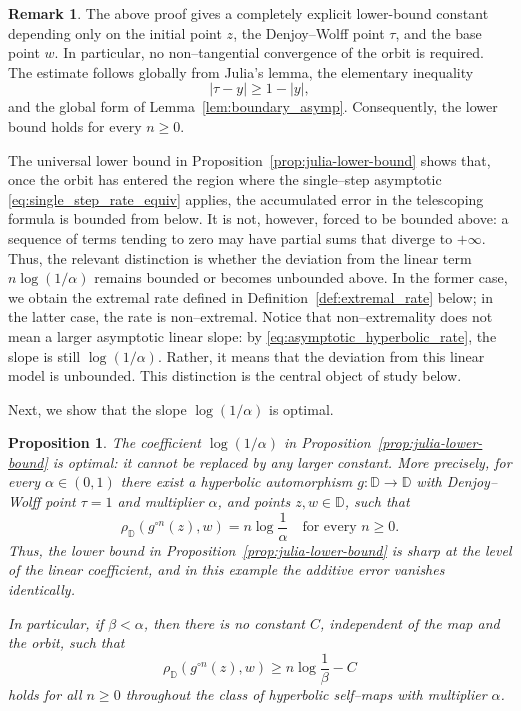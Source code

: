 \documentclass[12pt]{amsart}
\numberwithin{equation}{section}
\theoremstyle{plain}
\newtheorem{proposition}[equation]{Proposition}
\theoremstyle{definition}
\newtheorem{remark}[equation]{Remark}
\begin{document}
\begin{remark}
The above proof gives a completely explicit lower-bound constant depending
only on the initial point $z$, the Denjoy--Wolff point $\tau$, and the
base point $w$. In particular, no non--tangential convergence of the
orbit is required. The estimate follows globally from Julia's lemma,
the elementary inequality
\begin{equation*}
|\tau-y|\geq1-|y|,
\end{equation*}
and the global form of Lemma~\ref{lem:boundary_asymp}.
Consequently, the lower bound holds for every $n\geq0$.
\end{remark}



The universal lower bound in Proposition~\ref{prop:julia-lower-bound}
shows that, once the orbit has entered the region where the
single--step asymptotic \eqref{eq:single_step_rate_equiv} applies, the
accumulated error in the telescoping formula is bounded from below.
It is not, however, forced to be bounded above: a sequence of terms
tending to zero may have partial sums that diverge to $+\infty$.
Thus, the relevant distinction is whether the deviation from the
linear term $n\log(1/\alpha)$ remains bounded or becomes unbounded
above. In the former case, we obtain the extremal rate defined in
Definition~\ref{def:extremal_rate} below; in the latter case, the rate is
non--extremal. Notice that non--extremality does not mean a larger
asymptotic linear slope: by \eqref{eq:asymptotic_hyperbolic_rate}, the
slope is still $\log(1/\alpha)$. Rather, it means that the deviation
from this linear model is unbounded. This distinction is the central object of study below.

Next, we show that the slope $\log(1/\alpha)$ is optimal.
\begin{proposition}
\label{prop:sharpness}
The coefficient $\log(1/\alpha)$ in
Proposition~\ref{prop:julia-lower-bound} is optimal: it cannot be
replaced by any larger constant. More precisely, for every
$\alpha\in(0,1)$ there exist a hyperbolic automorphism
$g:\mathbb{D}\to\mathbb{D}$ with Denjoy--Wolff point $\tau=1$ and
multiplier $\alpha$, and points $z,w\in\mathbb{D}$, such that
\begin{equation}
\label{eq:sharp_exact_rate}
\rho_{\mathbb{D}}(g^{\circ n}(z),w)
=
n\log\frac{1}{\alpha}
\quad\text{for every }n\geq0.
\end{equation}
Thus, the lower bound in Proposition~\ref{prop:julia-lower-bound}
is sharp at the level of the linear coefficient, and in this example
the additive error vanishes identically.

In particular, if $\beta<\alpha$, then there is no constant $C$,
independent of the map and the orbit, such that
\begin{equation*}
\rho_{\mathbb{D}}(g^{\circ n}(z),w)
\geq
n\log\frac{1}{\beta}-C
\end{equation*}
holds for all $n\geq0$ throughout the class of hyperbolic
self--maps with multiplier $\alpha$.
\end{proposition}
\end{document}
